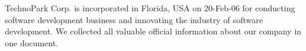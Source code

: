 TechnoPark Corp. is incorporated in Florida, USA on 20-Feb-06 for
conducting software development business and innovating the industry
of software development. We collected all valuable official information
about our company in one document.
